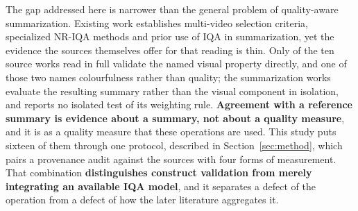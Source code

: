 The gap addressed here is narrower than the general problem of quality-aware
summarization. Existing work establishes multi-video selection criteria, specialized
NR-IQA methods and prior use of IQA in summarization, yet the evidence the sources
themselves offer for that reading is thin. Only \valPropriedade{} of the ten source works read in full validate the named
visual property directly, and one of those two names colourfulness rather than quality; the
summarization works evaluate the resulting summary rather than the visual component in
isolation, and \citet{korolkov2025keyframe} reports no isolated test of its weighting rule. \textbf{Agreement with a reference summary is evidence about a summary,
not about a quality measure}, and it is as a quality measure that these operations are used. This study puts sixteen of
them through one protocol, described in Section~\ref{sec:method}, which pairs a provenance
audit against the sources with four forms of measurement. That combination \textbf{distinguishes construct validation from merely integrating an
available IQA model}, and it separates a defect of the operation from a defect of how the
later literature aggregates it.

